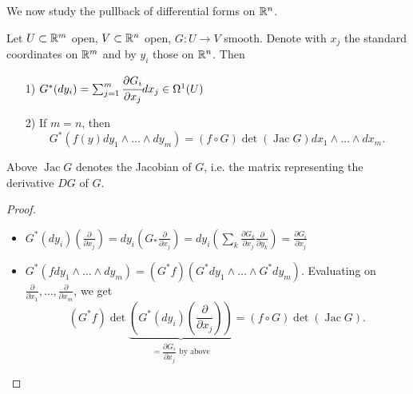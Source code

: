 We now study the pullback of differential forms on $\mathbb{R}^n$.
\begin{prop}
    Let $U \subset \mathbb{R}^m$ open, $V \subset \mathbb{R}^n$ open, $G : U \to  V$ smooth.
    Denote with $x_j$ the standard coordinates on $\mathbb{R}^m$ and by $y_i$ those on $\mathbb{R}^n$.
    Then
    \begin{itemize}
        \item[1)] $G^{*}(d y_i) = \sum_{j=1}^{m} \cfrac{\partial G_i}{\partial x_j} d x_j \in \Omega^{1}(U)$
        \item[2)] If $m =n$, then
            \[G^{*} (f(y) dy_1 \wedge \ldots\wedge dy_m) = (f  \circ  G) \det (\operatorname{Jac} G) dx_1 \wedge \ldots \wedge dx_m.\]
    \end{itemize}
\end{prop}
Above $\operatorname{Jac} G$ denotes the Jacobian of $G$, i.e. the matrix representing the derivative $DG$ of $G$.
\begin{proof}
    \begin{itemize}
        \item $G^{*}(dy_i)\left(\frac{\partial }{\partial x_j}\right) = dy_i \left( G_* \frac{\partial }{\partial x_j}\right) = dy_{i}(\sum_k \frac{\partial G_k}{\partial x_{j}} \frac{\partial }{\partial y_{k}}) = \frac{\partial G_i}{\partial x_{j}} $
        \item 
            $G^{*}( f d y_1 \wedge \ldots \wedge dy_m) = (G^{*} f) (G^{*} dy_1 \wedge \ldots \wedge G^{*} dy_m)$.
            Evaluating on $\frac{\partial }{\partial x_1},\dots,\frac{\partial }{\partial x_m}$, we get
            \[
                (G^{*} f) \det \underbrace{\left(G^{*}(dy_{i}) \left(\frac{\partial }{\partial x_j}\right)\right)}_{=\dfrac{\partial G_i}{\partial x_{j}} \text{ by above}}
                = (f  \circ  G) \det (\operatorname{Jac} G)
            .\] 

    \end{itemize}
\end{proof}
